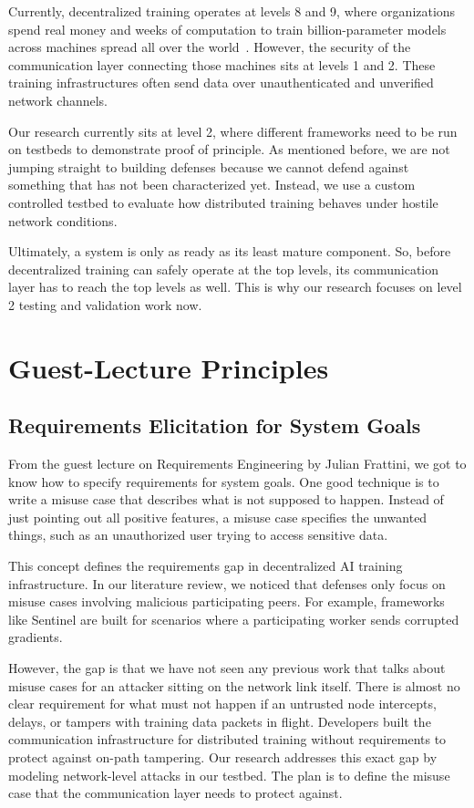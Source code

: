 \documentclass[11pt,a4paper]{article}
\begin{document}
Currently, decentralized training operates at levels 8 and 9, where organizations spend real money and weeks of computation to train billion-parameter models across machines spread all over the world~\cite{primeintellect2025intellect2}. However, the security of the communication layer connecting those machines sits at levels 1 and 2. These training infrastructures often send data over unauthenticated and unverified network channels.

Our research currently sits at level 2, where different frameworks need to be run on testbeds to demonstrate proof of principle. As mentioned before, we are not jumping straight to building defenses because we cannot defend against something that has not been characterized yet. Instead, we use a custom controlled testbed to evaluate how distributed training behaves under hostile network conditions.

Ultimately, a system is only as ready as its least mature component. So, before decentralized training can safely operate at the top levels, its communication layer has to reach the top levels as well. This is why our research focuses on level 2 testing and validation work now.

\section{Guest-Lecture Principles}

\subsection{Requirements Elicitation for System Goals}

From the guest lecture on Requirements Engineering by Julian Frattini, we got to know how to specify requirements for system goals. One good technique is to write a misuse case that describes what is not supposed to happen. Instead of just pointing out all positive features, a misuse case specifies the unwanted things, such as an unauthorized user trying to access sensitive data.

This concept defines the requirements gap in decentralized AI training infrastructure. In our literature review, we noticed that defenses only focus on misuse cases involving malicious participating peers. For example, frameworks like Sentinel are built for scenarios where a participating worker sends corrupted gradients.

However, the gap is that we have not seen any previous work that talks about misuse cases for an attacker sitting on the network link itself. There is almost no clear requirement for what must not happen if an untrusted node intercepts, delays, or tampers with training data packets in flight. Developers built the communication infrastructure for distributed training without requirements to protect against on-path tampering. Our research addresses this exact gap by modeling network-level attacks in our testbed. The plan is to define the misuse case that the communication layer needs to protect against.
\end{document}
